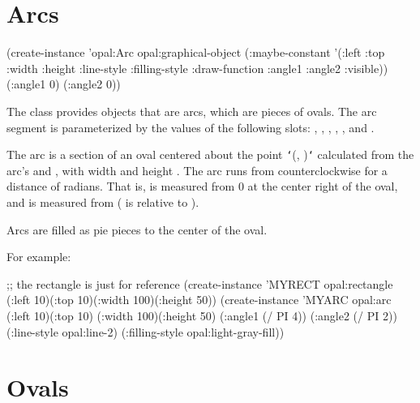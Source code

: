 \section{Arcs}

\begin{programexample}


(create-instance 'opal:Arc opal:graphical-object
  (:maybe-constant '(:left :top :width :height :line-style :filling-style
		     :draw-function :angle1 :angle2 :visible))
  (:angle1 0)
  (:angle2 0))
\end{programexample}

The  class provides objects that are arcs, which are pieces of
ovals.  The arc
segment is parameterized by the values of the following slots:
, , , , , and
.

The arc is a section of an oval centered about the point
{\tt\char`\<}(, ){\tt\char`\>} calculated from the arc's
 and , with
width  and height .  The arc runs from 
counterclockwise for a distance of  radians.  That is,
 is measured
from 0 at the center right of the oval, and  is measured from
 ( is relative to ).

Arcs are filled as pie pieces to the center of the oval.

\begin{group}
For example:
\begin{programexample}
\begin{center}
\end{center}
;; the rectangle is just for reference
(create-instance 'MYRECT opal:rectangle
  (:left 10)(:top 10)(:width 100)(:height 50))
(create-instance 'MYARC opal:arc
  (:left 10)(:top 10)
  (:width 100)(:height 50)
  (:angle1 (/ PI 4))
  (:angle2 (/ PI 2))
  (:line-style opal:line-2)
  (:filling-style opal:light-gray-fill))
\end{programexample}
\end{group}



\section{Ovals}

